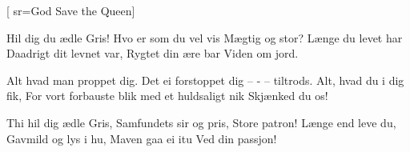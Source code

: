 
[
	sr={God Save the Queen}]
  
\beginverse*
Hil dig du ædle Gris!
Hvo er som du vel vis
Mægtig og stor?
Længe du levet har
Daadrigt dit levnet var,
Rygtet din ære bar
Viden om jord.
\endverse

\beginverse*
Alt hvad man proppet dig.
Det ei forstoppet dig –
- – tiltrods.
Alt, hvad du i dig fik,
For vort forbauste blik
med et huldsaligt nik
Skjænked du os!
\endverse

\beginverse*
Thi hil dig ædle Gris,
Samfundets sir og pris,
Store patron!
Længe end leve du,
Gavmild og lys i hu,
Maven gaa ei itu
Ved din passjon!
\endverse

\endsong
